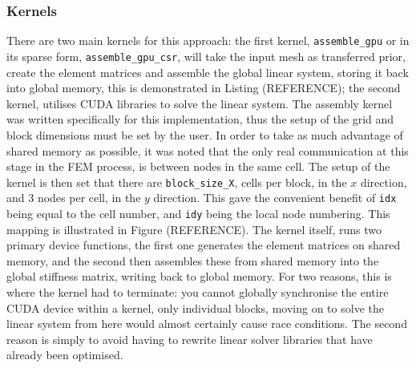 \subsubsection{Kernels}

There are two main kernels for this approach: the first kernel, \texttt{assemble\_gpu} or in its sparse form, \texttt{assemble\_gpu\_csr}, will take the input mesh as transferred prior, create the element matrices and assemble the global linear system, storing it back into global memory, this is demonstrated in Listing (REFERENCE); the second kernel, utilises CUDA libraries to solve the linear system. The assembly kernel was written specifically for this implementation, thus the setup of the grid and block dimensions must be set by the user. In order to take as much advantage of shared memory as possible, it was noted that the only real communication at this stage in the FEM process, is between nodes in the same cell. The setup of the kernel is then set that there are \texttt{block\_size\_X}, cells per block, in the $x$ direction, and 3 nodes per cell, in the $y$ direction. This gave the convenient benefit of \texttt{idx} being equal to the cell number, and \texttt{idy} being the local node numbering. This mapping is illustrated in Figure (REFERENCE). The kernel itself, runs two primary device functions, the first one generates the element matrices on shared memory, and the second then assembles these from shared memory into the global stiffness matrix, writing back to global memory. For two reasons, this is where the kernel had to terminate: you cannot globally synchronise the entire CUDA device within a kernel, only individual blocks, moving on to solve the linear system from here would almost certainly cause race conditions. The second reason is simply to avoid having to rewrite linear solver libraries that have already been optimised.

